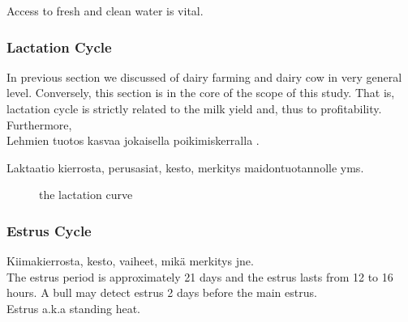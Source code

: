 \documentclass[english,12pt,a4paper,pdftex,elec,utf8]{aaltothesis}
\begin{document}
 Access to fresh and clean water is vital. \cite{luomuopas} 



\subsubsection{Lactation Cycle} \label{lactationcyclesection}

In previous section we discussed of dairy farming and dairy cow in very general level. Conversely, this section is in the core of the scope of this study. That is, lactation cycle is strictly related to the milk yield and, thus to profitability. Furthermore,  \\ 


Lehmien tuotos kasvaa jokaisella poikimiskerralla \cite{lehmientuotoskasvaa}.

Laktaatio kierrosta, perusasiat, kesto, merkitys maidontuotannolle yms.

 \begin{figure}
 \centering
    \caption{the lactation curve \cite{lactationcurve}}
 \end{figure}


\subsubsection{Estrus Cycle} \label{estruscyclesection}

Kiimakierrosta, kesto, vaiheet, mikä merkitys jne. \\

The estrus period is approximately 21 days and the estrus lasts from 12 to 16 hours. A bull may detect estrus 2 days before the main estrus.   \cite{julkaisuja52} \\


Estrus a.k.a standing heat. \\
\end{document}
